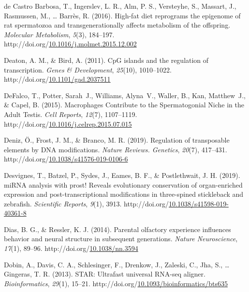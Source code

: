 \documentclass[12pt,twoside]{reedthesis}
\newlength{\cslhangindent}
\newenvironment{CSLReferences}[2] %
 {%
  \setlength{\parindent}{0pt}
  \ifodd #1 \everypar{\setlength{\hangindent}{\cslhangindent}}\ignorespaces\fi
  \ifnum #2 > 0
  \setlength{\parskip}{#2\baselineskip}
  \fi
 }%
 {}
\begin{document}
\begin{CSLReferences}{1}{0}
\leavevmode{}%
de Castro Barbosa, T., Ingerslev, L. R., Alm, P. S., Versteyhe, S., Massart, J., Rasmussen, M., \ldots{} Barrès, R. (2016). High-fat diet reprograms the epigenome of rat spermatozoa and transgenerationally affects metabolism of the offspring. \emph{Molecular Metabolism}, \emph{5}(3), 184--197. http://doi.org/\href{https://doi.org/10.1016/j.molmet.2015.12.002}{10.1016/j.molmet.2015.12.002}

\leavevmode{}%
Deaton, A. M., \& Bird, A. (2011). CpG islands and the regulation of transcription. \emph{Genes \& Development}, \emph{25}(10), 1010--1022. http://doi.org/\href{https://doi.org/10.1101/gad.2037511}{10.1101/gad.2037511}

\leavevmode{}%
DeFalco, T., Potter, Sarah~J., Williams, Alyna~V., Waller, B., Kan, Matthew~J., \& Capel, B. (2015). Macrophages Contribute to the Spermatogonial Niche in the Adult Testis. \emph{Cell Reports}, \emph{12}(7), 1107--1119. http://doi.org/\href{https://doi.org/10.1016/j.celrep.2015.07.015}{10.1016/j.celrep.2015.07.015}

\leavevmode{}%
Deniz, Ö., Frost, J. M., \& Branco, M. R. (2019). Regulation of transposable elements by DNA modifications. \emph{Nature Reviews. Genetics}, \emph{20}(7), 417--431. http://doi.org/\href{https://doi.org/10.1038/s41576-019-0106-6}{10.1038/s41576-019-0106-6}

\leavevmode{}%
Desvignes, T., Batzel, P., Sydes, J., Eames, B. F., \& Postlethwait, J. H. (2019). miRNA analysis with prost! Reveals evolutionary conservation of organ-enriched expression and post-transcriptional modifications in three-spined stickleback and zebrafish. \emph{Scientific Reports}, \emph{9}(1), 3913. http://doi.org/\href{https://doi.org/10.1038/s41598-019-40361-8}{10.1038/s41598-019-40361-8}

\leavevmode{}%
Dias, B. G., \& Ressler, K. J. (2014). Parental olfactory experience influences behavior and neural structure in subsequent generations. \emph{Nature Neuroscience}, \emph{17}(1), 89--96. http://doi.org/\href{https://doi.org/10.1038/nn.3594}{10.1038/nn.3594}

\leavevmode{}%
Dobin, A., Davis, C. A., Schlesinger, F., Drenkow, J., Zaleski, C., Jha, S., \ldots{} Gingeras, T. R. (2013). {STAR}: Ultrafast universal {RNA}-seq aligner. \emph{Bioinformatics}, \emph{29}(1), 15--21. http://doi.org/\href{https://doi.org/10.1093/bioinformatics/bts635}{10.1093/bioinformatics/bts635}


\end{CSLReferences}
\end{document}
